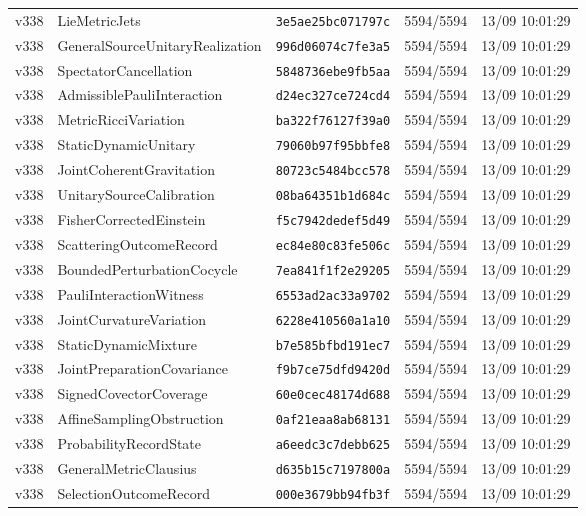 \documentclass[11pt]{article}
\theoremstyle{definition}\newtheorem{deriv}{Derivação}
\begin{document}
{\begin{longtable}{@{}lllll@{}}
v338 & LieMetricJets & \texttt{3e5ae25bc071797c} & 5594/5594 & 13/09 10:01:29 \\
v338 & GeneralSourceUnitaryRealization & \texttt{996d06074c7fe3a5} & 5594/5594 & 13/09 10:01:29 \\
v338 & SpectatorCancellation & \texttt{5848736ebe9fb5aa} & 5594/5594 & 13/09 10:01:29 \\
v338 & AdmissiblePauliInteraction & \texttt{d24ec327ce724cd4} & 5594/5594 & 13/09 10:01:29 \\
v338 & MetricRicciVariation & \texttt{ba322f76127f39a0} & 5594/5594 & 13/09 10:01:29 \\
v338 & StaticDynamicUnitary & \texttt{79060b97f95bbfe8} & 5594/5594 & 13/09 10:01:29 \\
v338 & JointCoherentGravitation & \texttt{80723c5484bcc578} & 5594/5594 & 13/09 10:01:29 \\
v338 & UnitarySourceCalibration & \texttt{08ba64351b1d684c} & 5594/5594 & 13/09 10:01:29 \\
v338 & FisherCorrectedEinstein & \texttt{f5c7942dedef5d49} & 5594/5594 & 13/09 10:01:29 \\
v338 & ScatteringOutcomeRecord & \texttt{ec84e80c83fe506c} & 5594/5594 & 13/09 10:01:29 \\
v338 & BoundedPerturbationCocycle & \texttt{7ea841f1f2e29205} & 5594/5594 & 13/09 10:01:29 \\
v338 & PauliInteractionWitness & \texttt{6553ad2ac33a9702} & 5594/5594 & 13/09 10:01:29 \\
v338 & JointCurvatureVariation & \texttt{6228e410560a1a10} & 5594/5594 & 13/09 10:01:29 \\
v338 & StaticDynamicMixture & \texttt{b7e585bfbd191ec7} & 5594/5594 & 13/09 10:01:29 \\
v338 & JointPreparationCovariance & \texttt{f9b7ce75dfd9420d} & 5594/5594 & 13/09 10:01:29 \\
v338 & SignedCovectorCoverage & \texttt{60e0cec48174d688} & 5594/5594 & 13/09 10:01:29 \\
v338 & AffineSamplingObstruction & \texttt{0af21eaa8ab68131} & 5594/5594 & 13/09 10:01:29 \\
v338 & ProbabilityRecordState & \texttt{a6eedc3c7debb625} & 5594/5594 & 13/09 10:01:29 \\
v338 & GeneralMetricClausius & \texttt{d635b15c7197800a} & 5594/5594 & 13/09 10:01:29 \\
v338 & SelectionOutcomeRecord & \texttt{000e3679bb94fb3f} & 5594/5594 & 13/09 10:01:29 \\

\end{longtable}}
\end{document}
